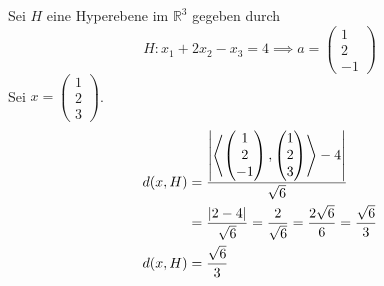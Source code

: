 \begin{example}
    Sei $H$ eine Hyperebene im $\mathbb{R}^3$ gegeben durch
    \[
        H:x_1 + 2x_2 - x_3 = 4 \implies a = \begin{pmatrix}
            1\\2\\-1
        \end{pmatrix}
    \]
    Sei $x = \begin{pmatrix}
        1\\2\\3
    \end{pmatrix}$.
    \begin{align*}
        d(x,H) &= \frac{\left\vert \left\langle \begin{pmatrix}
            1\\2\\-1
        \end{pmatrix},\begin{pmatrix}
            1\\2\\3
        \end{pmatrix} \right\rangle -4\right\vert}{\sqrt{6}}\\
        &= \frac{\vert 2 - 4\vert}{\sqrt{6}} = \frac{2}{\sqrt{6}} = \frac{2\sqrt{6}}{6} = \frac{\sqrt{6}}{3}\\
        d(x,H) &= \frac{\sqrt{6}}{3}
    \end{align*}
\end{example}